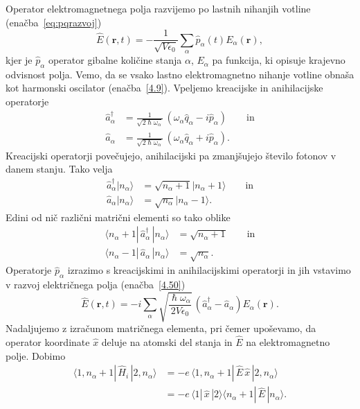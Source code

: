 Operator elektromagnetnega polja razvijemo po lastnih nihanjih votline (enačba~\ref{eq:pqrazvoj}) 
\begin{equation}
\hat{E}(\mathbf{r},t)=-\frac{1}{\sqrt{V\epsilon_{0}}}\sum_{\alpha}
\hat{p}_{\alpha}(t)E_{\alpha}(\mathbf{r}),
\label{4.50}
\end{equation}
kjer je $\hat{p}_{\alpha}$ operator gibalne količine stanja $\alpha$, $E_{\alpha}$
pa funkcija, ki opisuje krajevno odvisnost polja. Vemo, da se vsako lastno
elektromagnetno nihanje votline obnaša kot harmonski oscilator (enačba~\ref{4.9}).
Vpeljemo kreacijske in anihilacijske operatorje
\begin{align}
\hat{a}_{\alpha}^{\dagger} & =  \frac{1}{\sqrt{2\hslash\omega_{\alpha}}}\,
(\omega_{\alpha}\hat{q}_{\alpha}-i\hat{p}_{\alpha}) \qquad \mathrm{in} \\
\hat{a}_{\alpha} & =  \frac{1}{\sqrt{2\hslash\omega_{\alpha}}}\,(\omega_{\alpha}\hat{q}_{\alpha}+i\hat{p}_{\alpha}).
\end{align}
Kreacijski operatorji povečujejo, anihilacijski pa zmanjšujejo število
fotonov v danem stanju. Tako velja
\begin{align}
\hat{a}_{\alpha}^{\dagger}|n_{\alpha}\rangle & =  \sqrt{n_{\alpha}+1}
|n_{\alpha}+1\rangle\qquad \mathrm{in} \\
\hat{a}_{\alpha}|n_{\alpha}\rangle & =  \sqrt{n_{\alpha}}|n_{\alpha}-1\rangle.
\end{align}
Edini od nič različni matrični elementi so tako oblike
\begin{align}
\langle n_\alpha +1|\, \hat{a}_{\alpha}^{\dagger}\,|n_{\alpha}\rangle & = 
\sqrt{n_{\alpha}+1} \qquad \mathrm{in} \label{eq:ankr.1}\\
\langle n_\alpha-1|\,\hat{a}_{\alpha}\,|n_{\alpha}\rangle & =  \sqrt{n_{\alpha}}.
\label{eq:ankr}
\end{align}
Operatorje $\hat{p}_{\alpha}$ izrazimo s kreacijskimi in anihilacijskimi
operatorji in jih vstavimo v razvoj električnega polja (enačba~\ref{4.50})
\begin{equation}
\hat{E}(\mathbf{r},t)=-i\sum_{\alpha}\sqrt{\frac{\hslash\omega_{\alpha}}{2V\epsilon_{0}}}\,
\left(\hat{a}_{\alpha}^{\dagger}-\hat{a}_{\alpha}\right)E_{\alpha}(\mathbf{r}).
\label{4.53}
\end{equation}
Nadaljujemo z izračunom matričnega elementa, pri čemer upoševamo, da operator koordinate
$\hat{x}$ deluje na atomski del stanja in $\hat{E}$ na elektromagnetno
polje. Dobimo
\begin{align}
\langle1,n_{\alpha}+1|\,\hat{H}_{i}\,|2,n_{\alpha}\rangle & =  -e\,
\langle1,n_{\alpha}+1|\,\hat{E}\,\hat{x}\,|2,n_{\alpha}\rangle \\
 & =  -e\,\langle1|\,\hat{x}\,|2\rangle\langle n_{\alpha}+1|\,\hat{E}\,|n_{\alpha}\rangle.
\end{align}
